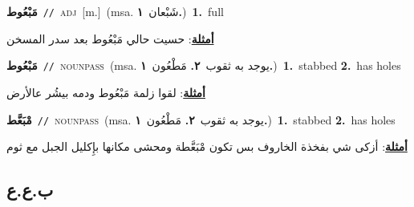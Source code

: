 \documentclass[10pt,a4paper,twoside]{article} %
\begin{document}
\begin{multicols}{2}
{\setlength\topsep{0pt}\textbf{\foreignlanguage{arabic}{مَبْعُوط}}\ {\color{gray}\texttt{//}\color{black}}\ \textsc{adj}\ [m.]\ \color{gray}(msa. \foreignlanguage{arabic}{شَبْعان}~\foreignlanguage{arabic}{\textbf{١.}})\color{black}\ \textbf{1.}~full\  \begin{flushright}\color{gray}\foreignlanguage{arabic}{\textbf{\underline{\foreignlanguage{arabic}{أمثلة}}}: حسيت حالي مَبْعُوط بعد سدر المسخن}\end{flushright}\color{black}} \vspace{2mm}

{\setlength\topsep{0pt}\textbf{\foreignlanguage{arabic}{مَبْعُوط}}\ {\color{gray}\texttt{//}\color{black}}\ \textsc{noun\textunderscore pass}\ \color{gray}(msa. \foreignlanguage{arabic}{يوجد به ثقوب}~\foreignlanguage{arabic}{\textbf{٢.}}  \foreignlanguage{arabic}{مَطْعُون}~\foreignlanguage{arabic}{\textbf{١.}})\color{black}\ \textbf{1.}~stabbed  \textbf{2.}~has holes\  \begin{flushright}\color{gray}\foreignlanguage{arabic}{\textbf{\underline{\foreignlanguage{arabic}{أمثلة}}}: لقوا زلمة مَبْعُوط ودمه بيشُر عالأرض}\end{flushright}\color{black}} \vspace{2mm}

{\setlength\topsep{0pt}\textbf{\foreignlanguage{arabic}{مْبَعَّط}}\ {\color{gray}\texttt{//}\color{black}}\ \textsc{noun\textunderscore pass}\ \color{gray}(msa. \foreignlanguage{arabic}{يوجد به ثقوب}~\foreignlanguage{arabic}{\textbf{٢.}}  \foreignlanguage{arabic}{مَطْعُون}~\foreignlanguage{arabic}{\textbf{١.}})\color{black}\ \textbf{1.}~stabbed  \textbf{2.}~has holes\  \begin{flushright}\color{gray}\foreignlanguage{arabic}{\textbf{\underline{\foreignlanguage{arabic}{أمثلة}}}: أزكى شي بفخذة الخاروف بس تكون مْبَعَّطة ومحشى مكانها بإِكليل الجبل مع ثوم}\end{flushright}\color{black}} \vspace{2mm}

\vspace{-3mm}
\subsection*{\color{blue}\foreignlanguage{arabic}{ب.ع.ع}\color{blue}{}} 


\end{multicols}
\end{document}
